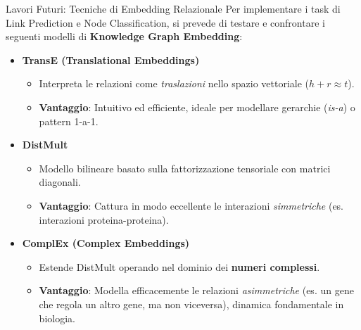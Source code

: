 \documentclass[aspectratio=169]{beamer}
\begin{document}
\begin{frame}{Lavori Futuri: Tecniche di Embedding Relazionale}
  \small
  Per implementare i task di Link Prediction e Node Classification, si prevede di testare e confrontare i seguenti modelli di \textbf{Knowledge Graph Embedding}:

  \vspace{0.3cm}
  \begin{itemize}
    \item[\faArrowRight] \textbf{TransE (Translational Embeddings)}
    \begin{itemize}
      \scriptsize \item Interpreta le relazioni come \textit{traslazioni} nello spazio vettoriale ($h+r\approx t$).
      \scriptsize \item \textbf{Vantaggio}: Intuitivo ed efficiente, ideale per modellare gerarchie (\textit{is-a}) o pattern 1-a-1.
    \end{itemize}

    \vspace{0.2cm}
    \item[\faExpand] \textbf{DistMult}
    \begin{itemize}
      \scriptsize \item Modello bilineare basato sulla fattorizzazione tensoriale con matrici diagonali.
      \scriptsize \item \textbf{Vantaggio}: Cattura in modo eccellente le interazioni \textit{simmetriche} (es. interazioni proteina-proteina).
    \end{itemize}

    \vspace{0.2cm}
    \item[\faSuperscript] \textbf{ComplEx (Complex Embeddings)}
    \begin{itemize}
      \scriptsize \item Estende DistMult operando nel dominio dei \textbf{numeri complessi}.
      \scriptsize \item \textbf{Vantaggio}: Modella efficacemente le relazioni \textit{asimmetriche} (es. un gene che regola un altro gene, ma non viceversa), dinamica fondamentale in biologia.
    \end{itemize}
  \end{itemize}
\end{frame}
\end{document}
